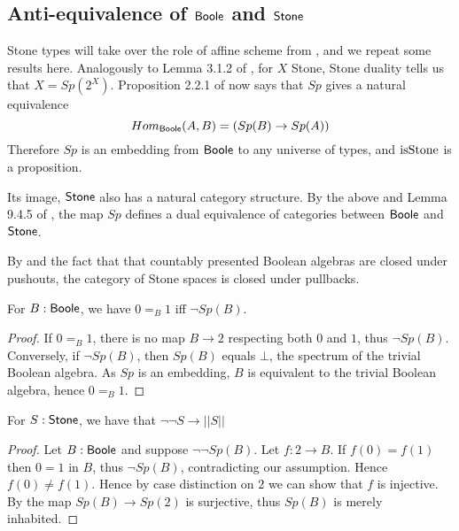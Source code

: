 \subsection{Anti-equivalence of $\mathsf{Boole}$ and $\mathsf{Stone}$}

\begin{remark}\label{SpIsAntiEquivalence}
Stone types will take over the role of affine scheme from \cite{draft}, 
and we repeat some results here. 
Analogously to Lemma 3.1.2 of \cite{draft}, 
for $X$ Stone, Stone duality tells us that $X = Sp(2^X)$. 
%
Proposition 2.2.1 of \cite{draft} now says that 
$Sp$ gives a natural equivalence 
\begin{equation}
   Hom_{\mathsf{Boole}} (A, B) = (Sp(B) \to Sp(A))
\end{equation}
Therefore $Sp$ is an embedding from $\mathsf{Boole}$ to any universe of types, and $\mathrm{isStone}$ is a proposition.

Its image, $\mathsf{Stone}$ also has a natural category structure.
By the above and Lemma 9.4.5 of \cite{hott}, the map $Sp$ defines a dual equivalence of categories between $\mathsf{Boole}$ and $\mathsf{Stone}$.
\end{remark}

\begin{remark}\label{StoneClosedUnderPullback}
  By  and the fact that that countably presented Boolean algebras are closed under pushouts, 
  the category of Stone spaces is closed under pullbacks. 
\end{remark}

\begin{lemma}\label{SpectrumEmptyIff01Equal}
  For $B:\mathsf{Boole}$, we have $0=_B1$ iff $\neg Sp(B)$.
\end{lemma}
\begin{proof}
  If $0=_B1$, there is no map $B\to 2$ respecting both $0$ and $1$, thus $\neg Sp(B)$. 
  Conversely, if $\neg Sp(B)$, then 
  $Sp(B)$ equals $\bot$, the spectrum of the trivial Boolean algebra. 
  As $Sp$ is an embedding, $B$ is equivalent to the trivial Boolean algebra, hence $0=_B1$. 
\end{proof}
\begin{corollary}\label{LemSurjectionsFormalToCompleteness}
 For $S:\mathsf{Stone}$, we have that $\neg \neg S \to || S ||$
\end{corollary}
\begin{proof}
  Let $B:\mathsf{Boole}$ and suppose $\neg \neg Sp(B)$. 
  Let $f:2 \to B$. If $f(0) = f(1)$ then $0=1$ in $B$, thus $\neg Sp(B)$, 
  contradicting our assumption. Hence $f(0)\neq f(1)$. 
  Hence by case distinction on $2$ we can show that $f$ is injective. 
  By  the map $Sp(B) \to Sp(2)$ is surjective, 
  thus $Sp(B)$ is merely inhabited. 
\end{proof} 

